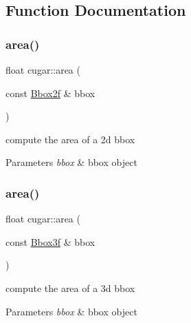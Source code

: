 \subsection{Function Documentation}
\mbox{\label{group___bbox_module_ga9bac92087484f436dd7eb6f20cb0b15a}} 
\subsubsection{\texorpdfstring{area()}{area()}\hspace{0.1cm}{\footnotesize\ttfamily [1/2]}}
{\footnotesize\ttfamily float cugar\+::area (\begin{DoxyParamCaption}\item[{const \hyperlink{structcugar_1_1_bbox}{Bbox2f} \&}]{bbox }\end{DoxyParamCaption})\hspace{0.3cm}{\ttfamily [inline]}}

compute the area of a 2d bbox


\begin{DoxyParams}{Parameters}
{\em bbox} & bbox object \\
\hline
\end{DoxyParams}
\mbox{\label{group___bbox_module_gae06f9ebe0da53f175c2d35b0ef604b1a}} 
\subsubsection{\texorpdfstring{area()}{area()}\hspace{0.1cm}{\footnotesize\ttfamily [2/2]}}
{\footnotesize\ttfamily float cugar\+::area (\begin{DoxyParamCaption}\item[{const \hyperlink{structcugar_1_1_bbox}{Bbox3f} \&}]{bbox }\end{DoxyParamCaption})\hspace{0.3cm}{\ttfamily [inline]}}

compute the area of a 3d bbox


\begin{DoxyParams}{Parameters}
{\em bbox} & bbox object \\
\hline
\end{DoxyParams}
\mbox{\label{group___bbox_module_ga997d14f97dd4c3c80e1896796170ea60}} 
